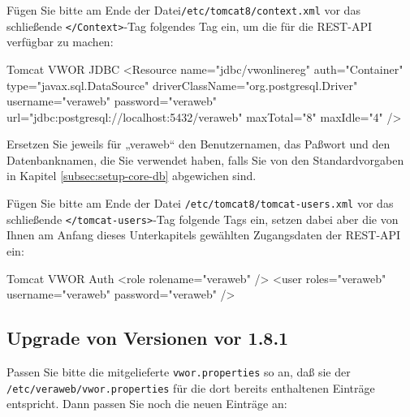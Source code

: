\begin{minipage}{\linewidth}
Fügen Sie bitte am Ende der Datei\texttt{/etc/tomcat8/context.xml} vor
das schließende \texttt{</Context>}-Tag folgendes Tag ein, um die
für die REST-API verfügbar zu machen:

\begin{lstdump}[language=XML]{Tomcat VWOR JDBC}
<Resource name="jdbc/vwonlinereg" auth="Container" type="javax.sql.DataSource"
 driverClassName="org.postgresql.Driver" username="veraweb" password="veraweb"
 url="jdbc:postgresql://localhost:5432/veraweb" maxTotal="8" maxIdle="4" />
\end{lstdump}

Ersetzen Sie jeweils für „veraweb“ den Benutzernamen, das Paßwort und den
Datenbanknamen, die Sie verwendet haben, falls Sie von den Standardvorgaben
  in Kapitel \ref{subsec:setup-core-db}
abgewichen sind.
\end{minipage}

\begin{minipage}{\linewidth}
Fügen Sie bitte am Ende der Datei \texttt{/etc/tomcat8/tomcat-users.xml} vor
das schließende \texttt{</tomcat-users>}-Tag folgende Tags ein, setzen dabei
aber die von Ihnen am Anfang dieses Unterkapitels gewählten Zugangsdaten der
REST-API ein:

\begin{lstdump}[language=XML]{Tomcat VWOR Auth}
<role rolename="veraweb" />
<user roles="veraweb" username="veraweb" password="veraweb" />
\end{lstdump}
\end{minipage}

\subsection{Upgrade von Versionen vor 1.8.1}\label{subsec:upgrade-181}

Passen Sie bitte die mitgelieferte \texttt{vwor.properties} so an,
daß sie der \texttt{/etc/veraweb/vwor.properties} für die
dort bereits enthaltenen Einträge entspricht. Dann passen Sie noch
die neuen Einträge an:


